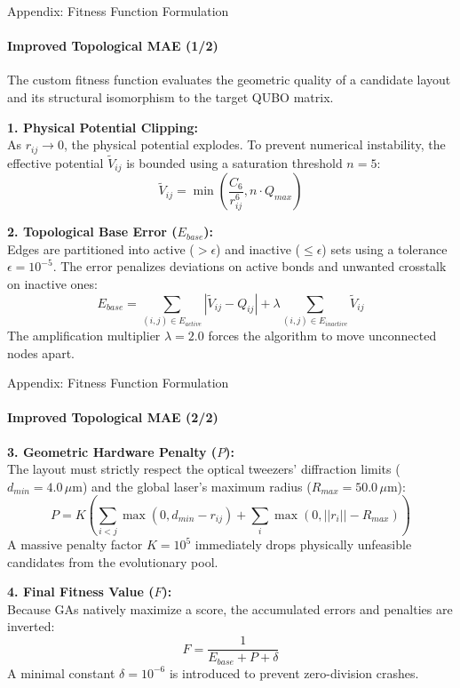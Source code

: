 \documentclass[10pt, aspectratio=169]{beamer}
\begin{document}
\begin{frame}{Appendix: Fitness Function Formulation}
\framesubtitle{Improved Topological MAE (1/2)}
    The custom fitness function evaluates the geometric quality of a candidate layout and its structural isomorphism to the target QUBO matrix.
    \vspace{0.2cm}

    \textbf{1. Physical Potential Clipping:}\\
    As $r_{ij} \to 0$, the physical potential explodes. To prevent numerical instability, the effective potential $\tilde{V}_{ij}$ is bounded using a saturation threshold $n=5$:
    $$ \tilde{V}_{ij} = \min\left(\frac{C_6}{r_{ij}^6}, n \cdot Q_{max}\right) $$
    
    \vspace{0.2cm}

    \textbf{2. Topological Base Error ($E_{base}$):}\\
    Edges are partitioned into active ($> \epsilon$) and inactive ($\leq \epsilon$) sets using a tolerance $\epsilon=10^{-5}$. The error penalizes deviations on active bonds and unwanted crosstalk on inactive ones:
    $$ E_{base} = \sum_{(i,j) \in E_{active}} |\tilde{V}_{ij} - Q_{ij}| + \lambda \sum_{(i,j) \in E_{inactive}} \tilde{V}_{ij} $$
    The amplification multiplier $\lambda = 2.0$ forces the algorithm to move unconnected nodes apart.
\end{frame}

\begin{frame}{Appendix: Fitness Function Formulation}
\framesubtitle{Improved Topological MAE (2/2)}
    \textbf{3. Geometric Hardware Penalty ($P$):}\\
    The layout must strictly respect the optical tweezers' diffraction limits ($d_{min} = 4.0 \, \mu\text{m}$) and the global laser's maximum radius ($R_{max} = 50.0 \, \mu\text{m}$):
    $$ P = K \left( \sum_{i<j} \max(0, d_{min} - r_{ij}) + \sum_{i} \max(0, ||r_i|| - R_{max}) \right) $$
    A massive penalty factor $K = 10^5$ immediately drops physically unfeasible candidates from the evolutionary pool.
    
    \vspace{0.4cm}

    \textbf{4. Final Fitness Value ($F$):}\\
    Because GAs natively maximize a score, the accumulated errors and penalties are inverted:
    $$ F = \frac{1}{E_{base} + P + \delta} $$
    A minimal constant $\delta = 10^{-6}$ is introduced to prevent zero-division crashes.
\end{frame}
\end{document}
